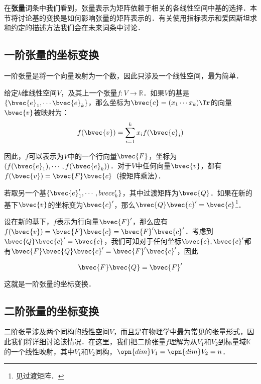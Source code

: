 \begin{issues}
\issueTODO
\end{issues}




在\textbf{张量}词条中我们看到，张量表示为矩阵依赖于相关的各线性空间中基的选择．本节将讨论基的变换是如何影响张量的矩阵表示的．有关使用指标表示和爱因斯坦求和约定的描述方法我们会在未来词条中讨论．%

\subsection{一阶张量的坐标变换}
一阶张量是将一个向量映射为一个数，因此只涉及一个线性空间，最为简单．

给定$k$维线性空间$V$，及其上一个张量$f:V\rightarrow\mathbb{R}$．如果$V$的基是$\{\bvec{e}_1, \cdots\bvec{e}_k\}$，那么坐标为$\bvec{c}=(x_1\cdots x_k)\Tr$的向量$\bvec{v}$被映射为：
\begin{equation}
f(\bvec{v})=\sum\limits_{i=1}^k x_if(\bvec{e}_i)
\end{equation}

因此，$f$可以表示为$V$中的一个行向量$\bvec{F}$，坐标为$(f(\bvec{e}_1), \cdots, f(\bvec{e}_k))$．对于$V$中任何向量$\bvec{v}$，都有$f(\bvec{v})=\bvec{F}\bvec{c}$（按矩阵乘法）．

若取另一个基$\{\bvec{e}_1', \cdots, \\bvec{e}_k'\}$，其中过渡矩阵为$\bvec{Q}$．如果在新的基下$\bvec{v}$的坐标变为$\bvec{c}'$，那么$\bvec{Q}\bvec{c}'=\bvec{c}$\footnote{见过渡矩阵．}．

设在新的基下，$f$表示为行向量$\bvec{F}'$，那么应有$f(\bvec{v})=\bvec{F}\bvec{c}=\bvec{F}'\bvec{c}'$．考虑到$\bvec{Q}\bvec{c}'=\bvec{c}$，我们可知对于任何坐标$\bvec{c}, \bvec{c}'$都有$\bvec{F}\bvec{Q}\bvec{c}'=\bvec{F}'\bvec{c}'$，因此

\begin{equation}
\bvec{F}\bvec{Q}=\bvec{F}'
\end{equation}

这就是一阶张量的坐标变换．
\subsection{二阶张量的坐标变换}

二阶张量涉及两个同构的线性空间$V$，而且是在物理学中最为常见的张量形式，因此我们将详细讨论该情况．在这里，我们把二阶张量$f$理解为从$V_1$和$V_2$到标量域$\mathbb{K}$的一个线性映射，其中$V_1$和$V_2$同构，$\opn{dim}V_1=\opn{dim}V_2=n$．

